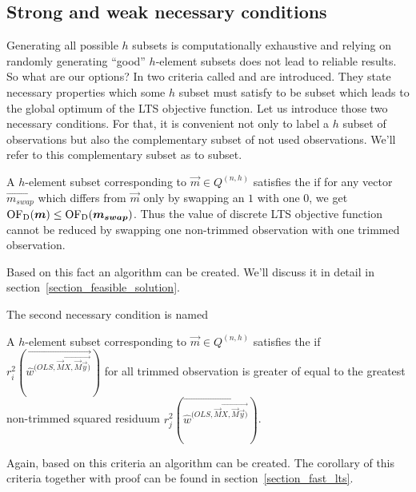 \subsection{Strong and weak necessary conditions}
Generating all possible $h$ subsets is computationally exhaustive and relying on randomly generating  ``good'' $h$-element subsets does not lead to reliable results. So what are our options? In \cite{hawkins1999improved} two criteria called  and  are introduced. They state necessary properties which some $h$ subset must satisfy to be subset which leads to the global optimum of the LTS objective function. Let us introduce those two necessary conditions. For that, it is convenient not only to label a $h$ subset of  observations but also the complementary subset of not used observations. We'll refer to this complementary subset as to  subset.

\begin{definition} \label{strong_condition}
 A $h$-element subset corresponding to $\vec{m} \in Q^{(n, h)}$ satisfies  the  if for any vector $\vec{m_{swap}}$ which differs from $\vec{m}$ only by swapping an $1$ with one $0$, we get  $\operatorname{OF_D}(\boldsymbol{m}) \leq \operatorname{OF_D}(\boldsymbol{m_{swap}})$. Thus the value of discrete LTS objective function cannot be reduced by swapping one non-trimmed observation with one trimmed observation.
\end{definition}

Based on this fact an algorithm can be created. We'll discuss it in detail in section~\ref{section_feasible_solution}.

The second necessary condition is named  

\begin{definition}
A $h$-element subset corresponding to $\vec{m} \in Q^{(n, h)}$ satisfies  the  if 
$r_i^2(\vec{\hat{w}^{(OLS, \vec{M}\vec{X, \vec{M}\vec{y})} } })$ for all trimmed observation is greater of equal to the greatest non-trimmed squared residuum $r_j^2(\vec{\hat{w}^{(OLS, \vec{M}\vec{X, \vec{M}\vec{y})} }})$.
\end{definition}    
Again, based on this criteria an algorithm can be created. The corollary of this criteria together with proof can be found in  section~\ref{section_fast_lts}. 

